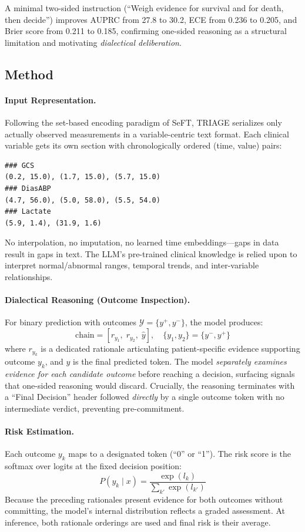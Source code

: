 \documentclass[11pt,a4paper]{article}
\begin{document}
A minimal two-sided instruction (``Weigh evidence for survival and for death, then decide'') improves AUPRC from 27.8 to 30.2, ECE from 0.236 to 0.205, and Brier score from 0.211 to 0.185, confirming one-sided reasoning as a structural limitation and motivating \emph{dialectical deliberation}.

\subsection{Method}

\paragraph{Input Representation.} Following the set-based encoding paradigm of SeFT, TRIAGE serializes only actually observed measurements in a variable-centric text format. Each clinical variable gets its own section with chronologically ordered (time, value) pairs:
\begin{verbatim}
### GCS
(0.2, 15.0), (1.7, 15.0), (5.7, 15.0)
### DiasABP
(4.7, 56.0), (5.0, 58.0), (5.5, 54.0)
### Lactate
(5.9, 1.4), (31.9, 1.6)
\end{verbatim}
No interpolation, no imputation, no learned time embeddings---gaps in data result in gaps in text. The LLM's pre-trained clinical knowledge is relied upon to interpret normal/abnormal ranges, temporal trends, and inter-variable relationships.

\paragraph{Dialectical Reasoning (Outcome Inspection).} For binary prediction with outcomes $\mathcal{Y} = \{y^+, y^-\}$, the model produces:
\begin{equation}
\mathrm{chain} = [r_{y_1},\; r_{y_2},\; \hat{y}], \quad \{y_1, y_2\} = \{y^-, y^+\}
\end{equation}
where $r_{y_k}$ is a dedicated rationale articulating patient-specific evidence supporting outcome $y_k$, and $\hat{y}$ is the final predicted token. The model \emph{separately examines evidence for each candidate outcome} before reaching a decision, surfacing signals that one-sided reasoning would discard. Crucially, the reasoning terminates with a ``Final Decision'' header followed \emph{directly} by a single outcome token with no intermediate verdict, preventing pre-commitment.

\paragraph{Risk Estimation.} Each outcome $y_k$ maps to a designated token (``0'' or ``1''). The risk score is the softmax over logits at the fixed decision position:
\begin{equation}
P(y_k \mid x) = \frac{\exp(l_k)}{\sum_{k'} \exp(l_{k'})}
\end{equation}
Because the preceding rationales present evidence for both outcomes without committing, the model's internal distribution reflects a graded assessment. At inference, both rationale orderings are used and final risk is their average.
\end{document}

